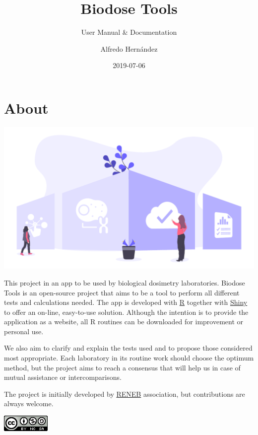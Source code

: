 \documentclass[]{scrartcl}
\title{Biodose Tools}
\subtitle{User Manual \& Documentation}
\author{Alfredo Hernández}
\date{2019-07-06}
\begin{document}

\maketitle

{
\setcounter{tocdepth}{2}
\tableofcontents
}
\hypertarget{about}{%
\section*{About}\label{about}}

\includegraphics{images/home.pdf}

This project in an app to be used by biological dosimetry laboratories. Biodose Tools is an open-source project that aims to be a tool to perform all different tests and calculations needed. The app is developed with \href{https://www.r-project.org/about.html}{R} \citep{R-base} together with \href{https://shiny.rstudio.com}{Shiny} \citep{R-shiny} to offer an on-line, easy-to-use solution. Although the intention is to provide the application as a website, all R routines can be downloaded for improvement or personal use.

We also aim to clarify and explain the tests used and to propose those considered most appropriate. Each laboratory in its routine work should choose the optimum method, but the project aims to reach a consensus that will help us in case of mutual assistance or intercomparisons.

The project is initially developed by \href{http://www.reneb.net}{RENEB} association, but contributions are always welcome.

\begin{center}\includegraphics[width=0.92in]{images/by-nc-sa} \end{center}
\end{document}

